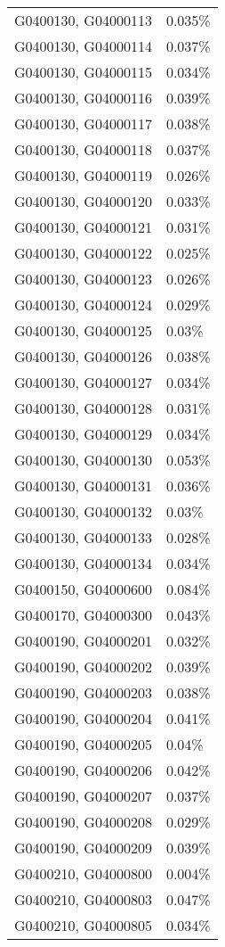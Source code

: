 \begin{longtable}[]{@{}ll@{}}
G0400130, G04000113 & 0.035\% \\
G0400130, G04000114 & 0.037\% \\
G0400130, G04000115 & 0.034\% \\
G0400130, G04000116 & 0.039\% \\
G0400130, G04000117 & 0.038\% \\
G0400130, G04000118 & 0.037\% \\
G0400130, G04000119 & 0.026\% \\
G0400130, G04000120 & 0.033\% \\
G0400130, G04000121 & 0.031\% \\
G0400130, G04000122 & 0.025\% \\
G0400130, G04000123 & 0.026\% \\
G0400130, G04000124 & 0.029\% \\
G0400130, G04000125 & 0.03\% \\
G0400130, G04000126 & 0.038\% \\
G0400130, G04000127 & 0.034\% \\
G0400130, G04000128 & 0.031\% \\
G0400130, G04000129 & 0.034\% \\
G0400130, G04000130 & 0.053\% \\
G0400130, G04000131 & 0.036\% \\
G0400130, G04000132 & 0.03\% \\
G0400130, G04000133 & 0.028\% \\
G0400130, G04000134 & 0.034\% \\
G0400150, G04000600 & 0.084\% \\
G0400170, G04000300 & 0.043\% \\
G0400190, G04000201 & 0.032\% \\
G0400190, G04000202 & 0.039\% \\
G0400190, G04000203 & 0.038\% \\
G0400190, G04000204 & 0.041\% \\
G0400190, G04000205 & 0.04\% \\
G0400190, G04000206 & 0.042\% \\
G0400190, G04000207 & 0.037\% \\
G0400190, G04000208 & 0.029\% \\
G0400190, G04000209 & 0.039\% \\
G0400210, G04000800 & 0.004\% \\
G0400210, G04000803 & 0.047\% \\
G0400210, G04000805 & 0.034\% \\

\end{longtable}
